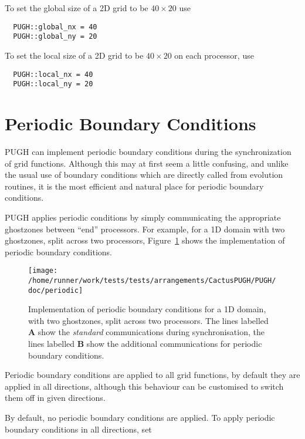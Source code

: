 \documentclass{article}
\begin{document}
To set the global size of a 2D grid to be $40\times 20$ use

\begin{verbatim}
  PUGH::global_nx = 40
  PUGH::global_ny = 20
\end{verbatim}

To set the local size of a 2D grid to be $40\times 20$ on each processor, use

\begin{verbatim}
  PUGH::local_nx = 40
  PUGH::local_ny = 20
\end{verbatim}


\section{Periodic Boundary Conditions}

PUGH can implement periodic boundary conditions during the synchronization
of grid functions. Although this may at first seem a little confusing, and
unlike the usual use of boundary conditions which are directly called from
evolution routines, it is the most efficient and natural place for periodic
boundary conditions.

PUGH applies periodic conditions by simply communicating the appropriate
ghostzones between ``end'' processors. For example, for a 1D domain with two
ghostzones, split across two processors, Figure~\ref{pugh::fig1} shows the implementation of periodic boundary conditions.

\begin{figure}[ht]
\begin{center}
\texttt{[image: /home/runner/work/tests/tests/arrangements/CactusPUGH/PUGH/doc/periodic]}
\end{center}
\caption[]{Implementation of periodic boundary conditions for a 1D domain, with two ghostzones, split across two processors. The lines labelled {\bf A} show the {\it standard} communications during synchronisation, the lines labelled
{\bf B} show the additional communications for periodic boundary conditions.}
\label{pugh::fig1}
\end{figure}

Periodic boundary conditions are applied to all grid functions, by default
they are applied in all directions, although this behaviour can be customised
to switch them off in given directions.

By default, no periodic boundary conditions are applied. To apply periodic boundary conditions in all directions, set
\end{document}
